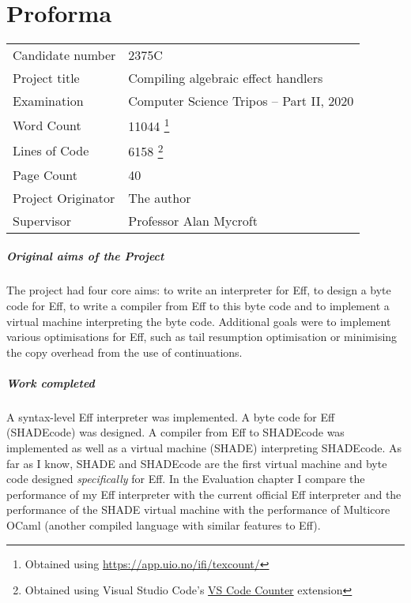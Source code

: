 \documentclass[%
    12pt,
    bibliography=toc,
    listof=leveldown,%
    oneside
]{book}
\begin{document}
\chapter{Proforma}
\begin{tabularx}{\textwidth}{@{} ll @{}}
Candidate number & 2375C \\
Project title & Compiling algebraic effect handlers \\
Examination & Computer Science Tripos -- Part II, 2020 \\
Word Count & 11044%
\footnote{Obtained using \url{https://app.uio.no/ifi/texcount/}} \\
Lines of Code & 6158%
\footnote{Obtained using Visual Studio Code's \href{https://marketplace.visualstudio.com/items?itemName=uctakeoff.vscode-counter}{VS Code Counter} extension} \\
Page Count & 40 \\
Project Originator & The author \\
Supervisor & Professor Alan Mycroft \\
\end{tabularx}

\paragraph{Original aims of the Project}

The project had four core aims: to write an interpreter for Eff, to design a
byte code for Eff, to write a compiler from Eff to this byte code and to
implement a virtual machine interpreting the byte code. Additional goals were
to implement various optimisations for Eff, such as tail resumption optimisation
or minimising the copy overhead from the use of continuations.

\paragraph{Work completed}

A syntax-level Eff interpreter was implemented. A byte code for Eff (SHADEcode)
was designed. A compiler from Eff to SHADEcode was implemented as well as a
virtual machine (SHADE) interpreting SHADEcode. As far as I know, SHADE and
SHADEcode are the first virtual machine and byte code designed
\emph{specifically} for Eff. In the Evaluation chapter I compare the performance
of my Eff interpreter with the current official Eff interpreter and the
performance of the SHADE virtual machine with the performance of Multicore
OCaml (another compiled language with similar features to Eff).
\end{document}
